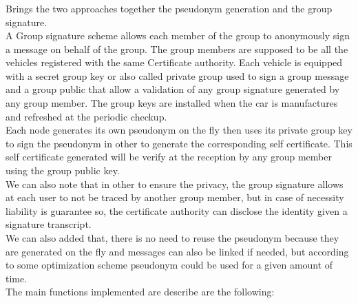 \subsubsection{\hybrid}
Brings the two approaches together the pseudonym generation and the group signature.\\
A Group signature scheme allows each member of the group to anonymously sign a message on behalf of the group. The group members are supposed to be all the vehicles registered with the same Certificate authority. Each vehicle is equipped with a secret group key or also called private group used to sign a group message and a group public that allow a validation of any group signature generated by any group member.  The group keys are installed when the car is manufactures and refreshed at the periodic checkup.\\
 Each node generates its own pseudonym on the fly then uses its private group key to sign the pseudonym in other to generate the corresponding self certificate. This self certificate generated will be verify at the reception by any group member using the group public key.\\ We can also note that in other to ensure the privacy, the group signature allows at each user to not be traced by another group member, but in case of necessity liability is guarantee so, the certificate authority can disclose the identity given a signature transcript.\\
We can also added that, there is no need to reuse the pseudonym because they are generated on the fly and messages can also be linked if needed, but according to some optimization scheme pseudonym could be used for a given amount of time.\\   
The main functions implemented are describe are the following:
